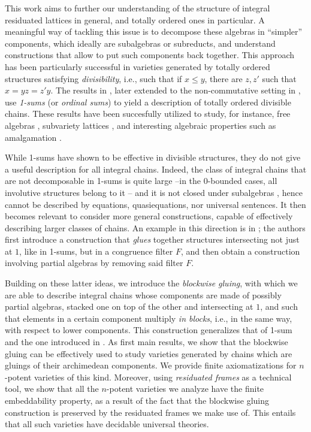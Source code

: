 \documentclass{amsart}
\theoremstyle{definition}
\numberwithin{equation}{section}
\begin{document}
This work aims to further our understanding of the structure of integral residuated lattices in general, and totally ordered ones in particular. A meaningful way of tackling this issue is to decompose these algebras in ``simpler'' components, which ideally are subalgebras or subreducts, and understand constructions that allow to put such components back together. 
This approach has been particularly successful in varieties generated by totally ordered structures satisfying {\em divisibility}, i.e., such that if $x \leq y$, there are $z, z'$ such that $x =  yz = z'y$. The results in \cite{AM2003}, later extended to the non-commutative setting in \cite{Dvurevcenskij}, use {\em 1-sums} (or {\em ordinal sums}) to yield a description of totally ordered divisible chains. These results have been succesfully utilized to study, for instance, free algebras \cite{AguzzoliBova}, subvariety lattices \cite{AM2003,AglianoUgolini22,AguzzoliBianchi}, and interesting algebraic properties such as amalgamation \cite{FussnerSantschi25}.

While 1-sums have shown to be effective in divisible structures, they do not give a useful description for all integral chains. Indeed, the class of integral chains that are not decomposable in 1-sums is quite large --in the $0$-bounded cases, all involutive structures belong to it \cite{Montagnaetal2006}-- and it is not closed under subalgebras \cite{GalatosUgolinimanuscript}, hence cannot be described by equations, quasiequations, nor universal sentences. It then becomes relevant to consider more general constructions, capable of effectively describing larger classes of chains. An example in this direction is in \cite{GalatosUgolini}; the authors first introduce a construction that {\em glues} together structures intersecting not just at $1$, like in 1-sums, but in a congruence filter $F$, and then obtain a construction involving partial algebras by removing said filter $F$. 

Building on these latter ideas, we introduce the {\em blockwise gluing}, with which we are able to describe integral chains whose components are made of possibly partial algebras, stacked one on top of the other and intersecting at $1$, and such that elements in a certain component multiply {\em in blocks}, i.e., in the same way, with respect to lower components. This construction generalizes that of 1-sum and the one introduced in \cite{GalatosUgolini}. As first main results, we show that the blockwise gluing can be effectively used to study varieties generated by chains which are gluings of their archimedean components. We provide finite axiomatizations for $n$-potent varieties of this kind. Moreover, using {\em residuated frames} \cite{GalatosJipsen2013} as a technical tool, we show that all the $n$-potent varieties we analyze have the finite embeddability property, as a result of the fact that the blockwise gluing construction is preserved by the residuated frames we make use of. This entails that all such varieties have decidable universal theories.
\end{document}
